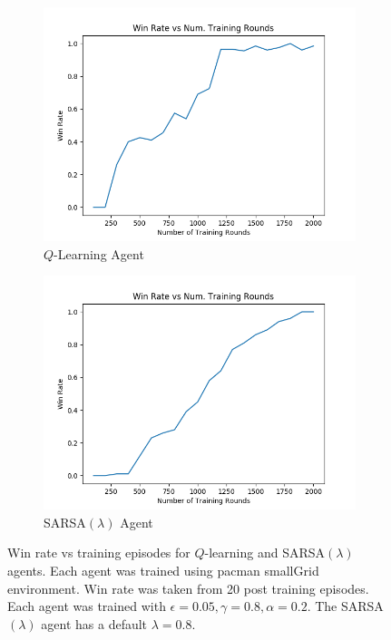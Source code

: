 \documentclass[10pt,conference]{IEEEtran}
\begin{document}
	\begin{figure}[h]
		\centering
		\begin{subfigure}{0.40\textwidth}
			\includegraphics[width=\textwidth]{./images/qlearning_winrate}
			\caption{\(Q\)-Learning Agent}
		\end{subfigure}%
		\begin{subfigure}{0.40\textwidth}
			\includegraphics[width=\textwidth]{./images/SARSA_winrate}
			\caption{SARSA\((\lambda)\) Agent}
		\end{subfigure}
		\caption{Win rate vs training episodes for \(Q\)-learning and
		SARSA\((\lambda)\) agents.  Each agent was trained using 
		pacman smallGrid environment.  Win rate was taken from 
		20 post training episodes. Each agent was trained with 
		\(\epsilon = 0.05, \gamma = 0.8, \alpha = 0.2\).  The 
		SARSA\((\lambda)\) agent has a default \(\lambda = 0.8\).}
		\label{winrate}
	\end{figure}
\end{document}
